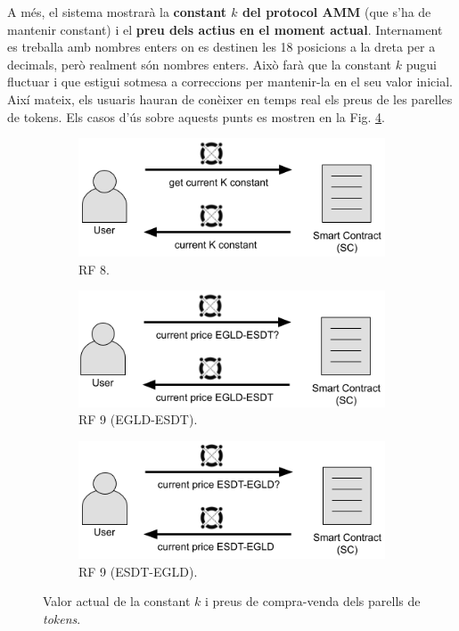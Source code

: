 \documentclass[11pt,a4paper]{article}
\begin{document}
A més, el sistema mostrarà la \textbf{constant \(k\) del protocol AMM} (que s'ha de mantenir constant) i el \textbf{preu dels actius en el moment actual}. Internament es treballa amb nombres enters on es destinen les 18 posicions a la dreta per a decimals, però realment són nombres enters. Això farà que la constant \(k\) pugui fluctuar i que estigui sotmesa a correccions per mantenir-la en el seu valor inicial. Així mateix, els usuaris hauran de conèixer en temps real els preus de les parelles de tokens. Els casos d'ús sobre aquests punts es mostren en la Fig. \ref{fig:RRFF8-9}.

\begin{figure}[!htb]
\begin{subfigure}[b]{0.33\textwidth}
  \includegraphics[width=\linewidth]{cu_k_constant.png}
  \caption{RF 8.}\label{fig:kconstant}
\end{subfigure}\hfill
\begin{subfigure}[b]{0.33\textwidth}
  \includegraphics[width=\linewidth]{cu_current_price_EGLD_ESDT.png}
  \caption{RF 9 (EGLD-ESDT).}\label{fig:price_egld_esdt}
\end{subfigure}\hfill
\begin{subfigure}[b]{0.33\textwidth}
  \includegraphics[width=\linewidth]{cu_current_price_ESDT_EGLD.png}
  \caption{RF 9 (ESDT-EGLD).}\label{fig:price_esdt_egld}
\end{subfigure}\hfill
\caption{Valor actual de la constant \(k\) i preus de compra-venda dels parells de \textit{tokens}.}
\label{fig:RRFF8-9}
\end{figure}
\end{document}
